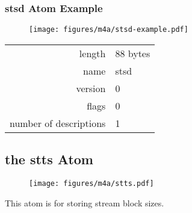 \subsubsection{stsd Atom Example}
\begin{figure}[h]
  \texttt{[image: figures/m4a/stsd-example.pdf]}
\end{figure}
\begin{tabular}{rl}
  \textsf{length} & 88 bytes \\
  \textsf{name} & \textsf{stsd} \\
  \textsf{version} & 0 \\
  \textsf{flags} & 0 \\
  \textsf{number of descriptions} & 1 \\
\end{tabular}

\clearpage





\subsection{the stts Atom}
\label{atom:stts}
\begin{figure}[h]
  \texttt{[image: figures/m4a/stts.pdf]}
\end{figure}
\par
\noindent
This atom is for storing stream block sizes.
